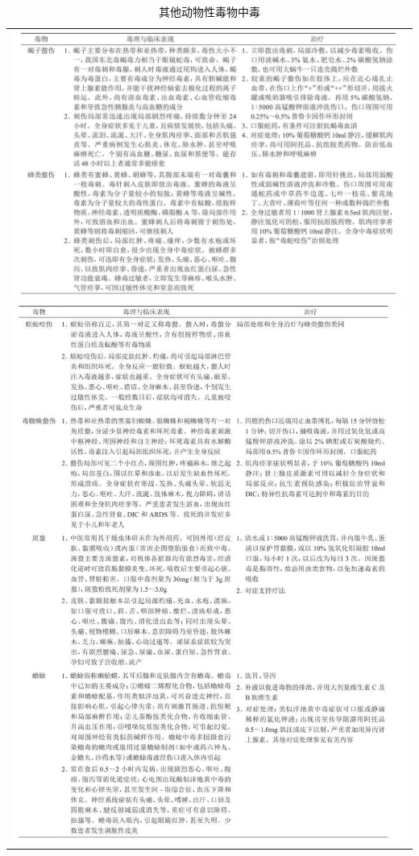 \begin{longtable}{c}
 \caption{其他动物性毒物中毒}
 \label{tab60-6}
 \endfirsthead
 \caption[]{其他动物性毒物中毒}
 \endhead
 \includegraphics[width=\textwidth,height=\textheight,keepaspectratio]{./images/Image00233.jpg}\\
 \includegraphics[width=\textwidth,height=\textheight,keepaspectratio]{./images/Image00234.jpg}\\

\end{longtable}
